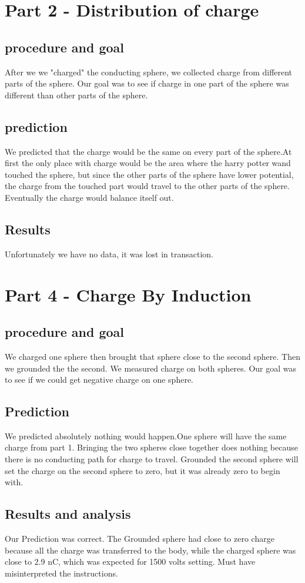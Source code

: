\documentclass[12pt]{article}
\begin{document}
\section*{Part 2 - Distribution of charge}
\subsection*{procedure and goal}
After we we "charged" the conducting sphere, we collected charge from different parts of the sphere. Our goal was to see if charge in one part of the sphere was different than other parts of the sphere.
\subsection*{prediction}
We predicted that the charge would be the same on every part of the sphere.At first the only place with charge would be the area where the harry potter wand touched the sphere, but since the other parts of the sphere have lower potential, the charge from the touched part would travel to the other parts of the sphere. Eventually the charge would balance itself out. 
\subsection*{Results} 
Unfortunately we have no data, it was lost in transaction.   

\section*{Part 4 - Charge By Induction}
\subsection*{procedure and goal}
We charged one sphere then brought that sphere close to the second sphere. Then we grounded the the second. We measured charge on both spheres. Our goal was to see if we could get negative charge on one sphere.

\subsection*{Prediction}
We predicted absolutely nothing would happen.One sphere will have the same charge from part 1. Bringing the two spheres close together does nothing because there is no conducting path for charge to travel. Grounded the second sphere will set the charge on the second sphere to zero, but it was already zero to begin with. 

\subsection*{Results and analysis}
Our Prediction was correct. The Grounded sphere had close to zero charge because all the charge was transferred to the body, while the charged sphere was close to 2.9 nC, which was expected for 1500 volts setting. Must have misinterpreted the instructions. 
\end{document}
